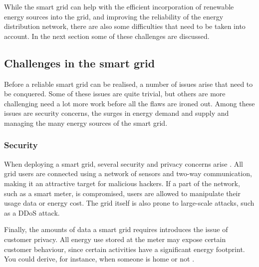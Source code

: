 While the smart grid can help with the efficient incorporation of renewable energy sources into the grid, and improving the reliability of the energy distribution network, there are also some difficulties that need to be taken into account. In the next section some of these challenges are discussed.


\subsection{Challenges in the smart grid} 
Before a reliable smart grid can be realised, a number of issues arise that need to be conquered. Some of these issues are quite trivial, but others are more challenging need a lot more work before all the flaws are ironed out. Among these issues are security concerns, the surges in energy demand and supply and managing the many energy sources of the smart grid.
 
\subsubsection{Security}
When deploying a smart grid, several security and privacy concerns arise \cite{McDanielMcLaughlin2009a}. All grid users are connected using a network of sensors and two-way communication, making it an attractive target for malicious hackers. If a part of the network, such as a smart meter, is compromised, users are allowed to manipulate their usage data or energy cost. The grid itself is also prone to large-scale attacks, such as a DDoS attack. 

Finally, the amounts of data a smart grid requires introduces the issue of customer privacy. All energy use stored at the meter may expose certain customer behaviour, since certain activities have a significant energy footprint. You could derive, for instance, when someone is home or not \cite{Molina-MarkhamShenoyFuEtAl2010}.

